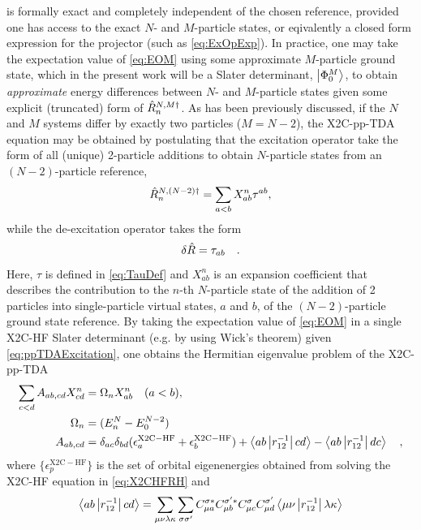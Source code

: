  is formally exact and completely independent of the chosen
reference, provided one has access to the exact $N$- and $M$-particle states,
or eqivalently a closed form expression for the projector (such as \cref{eq:ExOpExp}).
In practice, one may take the expectation value of \cref{eq:EOM} using some
approximate $M$-particle ground state, which in the present work will be
a Slater determinant, $\left\vert \Phi_0^M \right\rangle$, to obtain
\emph{approximate} energy differences between $N$- and $M$-particle states
given some explicit (truncated) form of $\hat{R}^{N,M\dagger}_n$.  As has been previously
discussed, if the $N$ and $M$ systems differ by exactly two particles ($M=N-
2$), the X2C-pp-TDA equation may be obtained by postulating that the excitation
operator take the form of all (unique) 2-particle additions to obtain
$N$-particle states from an $(N-2)$-particle reference,
\begin{equation}
  \hat{R}_n^{N,(N-2)\dagger} = \sum_{a < b} X^n_{ab} \tau^{ab} , \label{eq:ppTDAExcitation}
\end{equation}
while the de-excitation operator takes the form
\begin{equation}
  \delta\hat{R} = \tau_{ab}\quad.
\end{equation}
Here, $\tau$ is defined in \cref{eq:TauDef} and $X^n_{ab}$ is an expansion
coefficient that describes the contribution to the $n$-th $N$-particle state of
the addition of 2 particles into single-particle virtual states, $a$ and $b$,
of the $(N-2)$-particle ground state reference. By taking the expectation value
of \cref{eq:EOM} in a single X2C-HF Slater determinant (e.g. by using Wick's theorem) given
\cref{eq:ppTDAExcitation}, one obtains the Hermitian eigenvalue problem of the
X2C-pp-TDA
\begin{align}
\sum_{c < d} A_{ab,cd} X^n_{cd} &= \Omega_n X^n_{ab} \quad (a < b), \label{eq:ppTDA}\\
\Omega_n &= (E_n^N - E_0^{N-2}) \\
  A_{ab,cd} &= \delta_{ac}\delta_{bd} (\epsilon^\mathrm{X2C-HF}_a + \epsilon^\mathrm{X2C-HF}_b) + \left\langle ab \left\vert r_{12}^{-1} \right\vert cd \right\rangle - \left\langle ab \left\vert r_{12}^{-1} \right\vert dc \right\rangle  \quad \label{eq:AMat},
\end{align}
where  $\{\epsilon^\mathrm{X2C-HF}_p\}$ is the set of orbital
eigenenergies obtained from solving the X2C-HF equation in \cref{eq:X2CHFRH} and
\begin{equation}
  \left\langle ab \left\vert r^{-1}_{12} \right\vert cd \right\rangle = \sum_{\mu\nu\lambda\kappa} \sum_{\sigma\sigma'} 
C^{\sigma*}_{\mu a}
C^{\sigma'*}_{\mu b}
C^{\sigma}_{\mu c}
C^{\sigma'}_{\mu d}
\left\langle \mu\nu \left\vert r^{-1}_{12} \right\vert \lambda\kappa \right\rangle
\end{equation}
